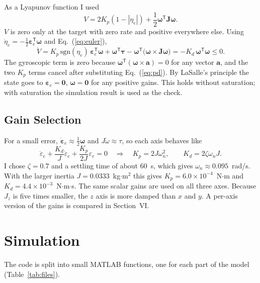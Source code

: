 \documentclass[letterpaper,10pt]{article}
\newcommand{\vv}[1]{\bm{#1}}
\newcommand{\Tp}{^{\mathsf{T}}}
\begin{document}
As a Lyapunov function I used \cite{wie_barba}
\begin{equation}
  V = 2K_p(1 - |\eta_e|) + \frac12\vv{\omega}\Tp\vv{J}\vv{\omega}.
  \label{eq:V}
\end{equation}
$V$ is zero only at the target with zero rate and positive everywhere else.
Using $\dot\eta_e = -\frac12\vv{\varepsilon}_e\Tp\vv{\omega}$ and
Eq.~(\ref{eq:euler}),
\begin{equation}
  \dot V = K_p\,\mathrm{sgn}(\eta_e)\,\vv{\varepsilon}_e\Tp\vv{\omega}
  + \vv{\omega}\Tp\vv{\tau} - \vv{\omega}\Tp\bigl(\vv{\omega}\times\vv{J}\vv{\omega}\bigr)
  = -K_d\,\vv{\omega}\Tp\vv{\omega} \le 0 .
  \label{eq:Vdot}
\end{equation}
The gyroscopic term is zero because $\vv{\omega}\Tp(\vv{\omega}\times\vv{a}) = 0$
for any vector $\vv{a}$, and the two $K_p$ terms cancel after substituting
Eq.~(\ref{eq:pd}). By LaSalle's principle the state goes to
$\vv{\varepsilon}_e = \vv{0}$, $\vv{\omega} = \vv{0}$ for any positive gains.
This holds without saturation; with saturation the simulation result is used
as the check.

\subsection{Gain Selection}

For a small error, $\dot{\vv{\varepsilon}}_e \approx \frac12\vv{\omega}$ and
$J\dot\omega \approx \tau$, so each axis behaves like
\begin{equation}
  \ddot\varepsilon_e + \frac{K_d}{J}\dot\varepsilon_e + \frac{K_p}{2J}\varepsilon_e = 0
  \quad\Rightarrow\quad
  K_p = 2J\omega_n^2, \qquad K_d = 2\zeta\omega_n J .
  \label{eq:gains}
\end{equation}
I chose $\zeta = 0.7$ and a settling time of about 60~s, which gives
$\omega_n \approx 0.095$~rad/s. With the larger inertia $J = 0.0333$~kg$\cdot$m$^2$
this gives $K_p = 6.0\times10^{-4}$~N$\cdot$m and $K_d = 4.4\times10^{-3}$~N$\cdot$m$\cdot$s.
The same scalar gains are used on all three axes. Because $J_z$ is five times
smaller, the $z$ axis is more damped than $x$ and $y$. A per-axis version of
the gains is compared in Section~VI.

\section{Simulation}

The code is split into small MATLAB functions, one for each part of the
model (Table~\ref{tab:files}).
\end{document}
